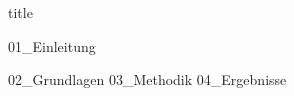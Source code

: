 \documentclass{article}
\begin{document}
{title}

\frontmatter

\tableofcontents

\listoffigures
\listoftables

\mainmatter

{01_Einleitung}

{02_Grundlagen}
{03_Methodik}
{04_Ergebnisse}


\newpage
\printbibliography[heading = bibintoc, title = Bibliography]    %

\addappendix

\end{document}
